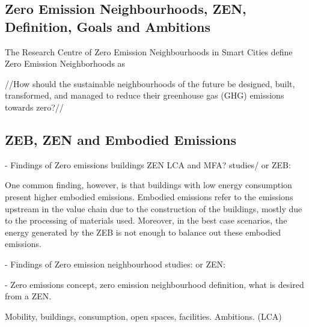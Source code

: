 \subsection{Zero Emission Neighbourhoods, ZEN, Definition, Goals and Ambitions}


The Research Centre of Zero Emission Neighbourhoods in Smart Cities define Zero Emission Neighborhoods as 


//How should the sustainable neighbourhoods of the future be designed, built, transformed, and managed to reduce their greenhouse gas (GHG) emissions towards zero?//


\subsection{ZEB, ZEN and Embodied Emissions}

- Findings of Zero emissions buildings ZEN LCA and MFA? studies/ or ZEB:


One common finding, however, is that buildings with low energy consumption present higher embodied emissions. Embodied emissions refer to the emissions upstream in the value chain due to the construction of the buildings, mostly due to the processing of materials used.  Moreover, in the best case scenarios, the energy generated by the ZEB is not enough to balance out these embodied emissions.  

- Findings of Zero emission neighbourhood studies: or ZEN:

	- Zero emissions concept, zero emission neighbourhood definition, what is desired from a ZEN. 

	Mobility, buildings, consumption, open spaces, facilities. 
	Ambitions. (LCA) 

